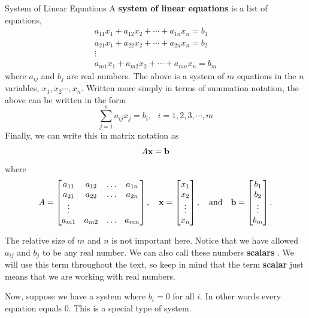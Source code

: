 \begin{definition}{System of Linear Equations}\label{def:systemoflinearequations}
A \textbf{system of linear equations}  is a list of equations,
\begin{equation*}
\begin{array}{c}
a_{11}x_{1}+a_{12}x_{2}+\cdots +a_{1n}x_{n}=b_{1} \\
a_{21}x_{1}+a_{22}x_{2}+\cdots +a_{2n}x_{n}=b_{2} \\
\vdots \\
a_{m1}x_{1}+a_{m2}x_{2}+\cdots +a_{mn}x_{n}=b_{m}
\end{array}
\end{equation*}
where $a_{ij}$ and $b_{j}$ are real numbers. The above is a system
of $m$ equations in the $n$ variables, $x_{1},x_{2}\cdots ,x_{n}$.
 Written more simply in terms
of summation notation, the above can be written in the form
\begin{equation*}
\sum_{j=1}^{n}a_{ij}x_{j}=b_{i},
\text{ }i=1,2,3,\cdots ,m
\end{equation*}
Finally, we can write this in matrix notation as
$$
A \mathbf{x} = \mathbf{b} 
$$
where 
$$
A = \begin{bmatrix}
a_{11} & a_{12} & \dots & a_{1n}\\
a_{21} & a_{22} & \dots & a_{2n}\\
\vdots\\
a_{m1} & a_{m2} & \dots & a_{mn}
\end{bmatrix}, \ \ \ \mathbf{x} = \begin{bmatrix} x_1 \\ x_2 \\ \vdots \\ x_n\end{bmatrix}, \ \ \text{ and } \ \ \mathbf{b} = \begin{bmatrix} b_1 \\ b_2 \\ \vdots \\ b_m\end{bmatrix}.
$$
\end{definition}

The relative size of $m$ and $n$ is not important here. Notice that we
have allowed $a_{ij}$ and $b_{j}$ to be any real number.  We can also
call these numbers \textbf{scalars} . We will use this
term throughout the text, so keep in mind that the term
\textbf{scalar} just means that we are working with real numbers.

Now, suppose we have a system where $b_{i} = 0$ for all $i$. In other words every
equation equals $0$. This is a special type of system.

